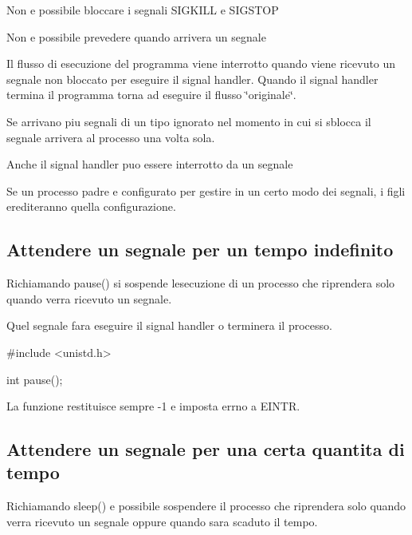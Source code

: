 \begin{DoxyItemize}
\item Non e\textquotesingle{} possibile bloccare i segnali {\ttfamily S\+I\+G\+K\+I\+LL} e {\ttfamily S\+I\+G\+S\+T\+OP}
\item Non e\textquotesingle{} possibile prevedere quando arrivera\textquotesingle{} un segnale
\item Il flusso di esecuzione del programma viene interrotto quando viene ricevuto un segnale non bloccato per eseguire il signal handler. Quando il signal handler termina il programma torna ad eseguire il flusso \char`\"{}originale\char`\"{}.
\item Se arrivano piu\textquotesingle{} segnali di un tipo ignorato nel momento in cui si sblocca il segnale arrivera\textquotesingle{} al processo una volta sola.
\item Anche il signal handler puo\textquotesingle{} essere interrotto da un segnale
\item Se un processo padre e\textquotesingle{} configurato per gestire in un certo modo dei segnali, i figli erediteranno quella configurazione.
\end{DoxyItemize}

\subsection*{Attendere un segnale per un tempo indefinito}

Richiamando {\ttfamily pause()} si sospende l\textquotesingle{}esecuzione di un processo che riprendera\textquotesingle{} solo quando verra\textquotesingle{} ricevuto un segnale.

Quel segnale fara\textquotesingle{} eseguire il signal handler o terminera\textquotesingle{} il processo.


\begin{DoxyCode}
#include <unistd.h>

int pause();
\end{DoxyCode}


La funzione restituisce sempre -\/1 e imposta errno a E\+I\+N\+TR.

\subsection*{Attendere un segnale per una certa quantita\textquotesingle{} di tempo}

Richiamando {\ttfamily sleep()} e\textquotesingle{} possibile sospendere il processo che riprendera\textquotesingle{} solo quando verra\textquotesingle{} ricevuto un segnale oppure quando sara\textquotesingle{} scaduto il tempo.


